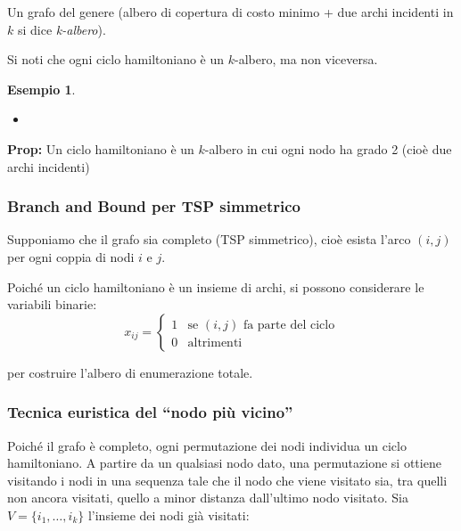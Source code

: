 \documentclass[a4paper,11pt]{book}
\theoremstyle{break}
\newtheorem{es}[deff]{Esempio}
\begin{document}
Un grafo del genere (albero di copertura di costo minimo + due archi incidenti in $k$ si dice \emph{k-albero}).\smallskip

Si noti che ogni ciclo hamiltoniano è un $k$-albero, ma non viceversa.\smallskip
\begin{es}
\begin{itemize}
 \item []
\end{itemize}

 \begin{center}
\smallskip

\end{center}
\end{es}

\textbf{Prop:} Un ciclo hamiltoniano è un $k$-albero in cui ogni nodo ha grado 2 (cioè due archi incidenti)

\subsubsection{Branch and Bound per TSP simmetrico}


Supponiamo che il grafo sia completo (TSP simmetrico), cioè esista l'arco $(i, j)$ per ogni coppia di nodi $i$ e $j$.\smallskip

Poiché un ciclo hamiltoniano è un insieme di archi, si possono considerare le variabili binarie:
\[x_{ij}=\begin{cases}1 &\text{se $(i, j)$ fa parte del ciclo} \\ 0 &\text{altrimenti}\end{cases}\]

per costruire l'albero di enumerazione totale.

\subsubsection*{Tecnica euristica del ``nodo più vicino''}

Poiché il grafo è completo, ogni permutazione dei nodi individua un ciclo hamiltoniano. A partire da un qualsiasi nodo dato, una permutazione si ottiene visitando i nodi in una sequenza tale che il nodo che viene visitato sia, tra quelli non ancora visitati, quello a minor distanza dall'ultimo nodo visitato. Sia $V = \{i_1, \hdots, i_k\}$ l'insieme dei nodi già visitati:
\end{document}
